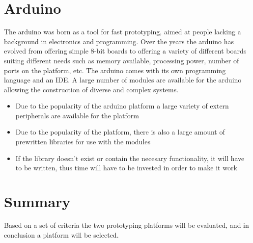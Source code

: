 \section{Arduino}
The arduino was born as a tool for fast prototyping, aimed at people lacking a background in electronics and programming.
Over the years the arduino has evolved from offering simple 8-bit boards to offering a variety of different boards suiting
different needs such as memory available, processing power, number of ports on the platform, etc. The arduino comes with its own programming language and an IDE. A large number of modules are available for the arduino allowing the construction of diverse and complex systems.\Source

\begin{itemize}
	\item Due to the popularity of the arduino platform a large variety of extern peripherals are available for the platform
	\item Due to the popularity of the platform, there is also a large amount of prewritten libraries for use with the modules
	\item If the library doesn't exist or contain the necesary functionality, it will have to be written, thus time will have to be invested in order to make it work
\end{itemize}

\section{Summary}
Based on a set of criteria the two prototyping platforms will be evaluated, and in conclusion a platform will be selected.

